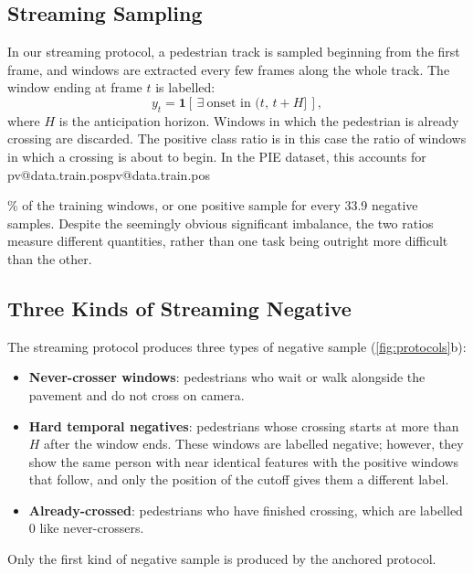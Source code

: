 \documentclass[10pt,a4paper,twocolumn]{article}
\makeatletter
\newcommand{\V}[1]{\ifcsname pv@#1\endcsname\csname pv@#1\endcsname\else
  \PackageError{numbers}{Unknown number key: #1}{Run figures/make_tables.py}\fi}
\makeatother
\begin{document}
\subsection{Streaming Sampling}
In our streaming protocol, a pedestrian track is sampled beginning from the
first frame, and windows are extracted every few frames along the whole track.
The window ending at frame $t$ is labelled:
\begin{equation}
  y_t = \mathbf{1}\left[\, \exists\ \text{onset in } (t,\, t+H] \,\right],
  \label{eq:binlabel}
\end{equation}
where $H$ is the anticipation horizon. Windows in which the pedestrian is
already crossing are discarded. The positive class ratio is in this case the
ratio of windows in which a crossing is about to begin. In the PIE dataset,
this accounts for \V{data.train.pos}\% of the training windows, or one
positive sample for every 33.9 negative samples. Despite the seemingly obvious
significant imbalance, the two ratios measure different quantities, rather
than one task being outright more difficult than the other.

\subsection{Three Kinds of Streaming Negative}
\label{sec:taxonomy}
The streaming protocol produces three types of negative sample
(\cref{fig:protocols}b):
\begin{itemize}\setlength{\itemsep}{0pt}
  \item \textbf{Never-crosser windows}: pedestrians who wait or walk alongside
  the pavement and do not cross on camera.
  \item \textbf{Hard temporal negatives}: pedestrians whose crossing starts at
  more than $H$ after the window ends. These windows are labelled negative;
  however, they show the same person with near identical features with the
  positive windows that follow, and only the position of the cutoff gives them
  a different label.
  \item \textbf{Already-crossed}: pedestrians who have finished crossing, which
  are labelled 0 like never-crossers.
\end{itemize}
Only the first kind of negative sample is produced by the anchored protocol.
\end{document}

